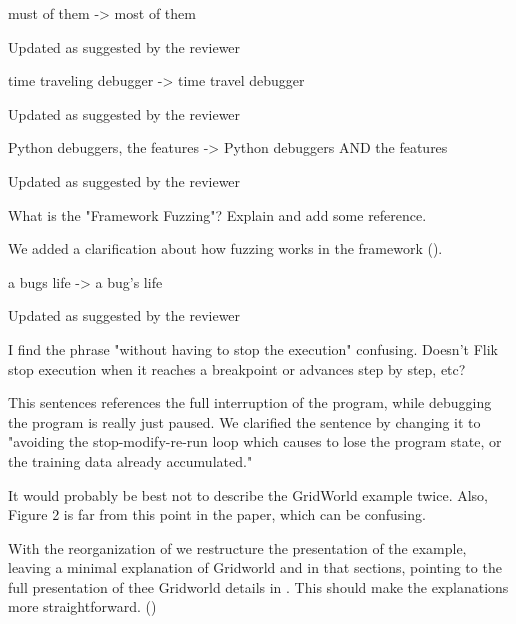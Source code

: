 \begin{remark}
must of them -> most of them
\end{remark}
\begin{solved}
Updated as suggested by the reviewer
\end{solved}

\begin{remark}
time traveling debugger -> time travel debugger
\end{remark}
\begin{solved}
Updated as suggested by the reviewer
\end{solved}

\begin{remark}
Python debuggers, the features -> Python debuggers AND the features
\end{remark}
\begin{solved}
Updated as suggested by the reviewer
\end{solved}

\begin{remark}\label{rem:fuzzing}
What is the "Framework Fuzzing"? Explain and add some reference.
\end{remark}
\begin{solved}
We added a clarification about how  fuzzing works in the framework ().
\end{solved}

\begin{remark}
a bugs life -> a bug's life
\end{remark}
\begin{solved}
Updated as suggested by the reviewer
\end{solved}

\begin{remark}
I find the phrase "without having to stop the execution" confusing. Doesn't Flik stop execution when it reaches a breakpoint or advances step by step, etc?
\end{remark}
\begin{solved}
This sentences references the full interruption of the program, while debugging the program is really just paused. We clarified the sentence by changing it to "avoiding the stop-modify-re-run loop which causes to lose the program state, or the training data already accumulated."
\end{solved}

\begin{remark}\label{rem:gridworld}
It would probably be best not to describe the GridWorld example twice. Also, Figure 2 is far from this point in the paper, which can be confusing.
\end{remark}
\begin{solved}
With the reorganization of  we restructure the presentation of the example, leaving a minimal explanation of Gridworld and  in that sections, pointing to the full presentation of thee Gridworld details in . This should make the explanations more straightforward. ()
\end{solved}

